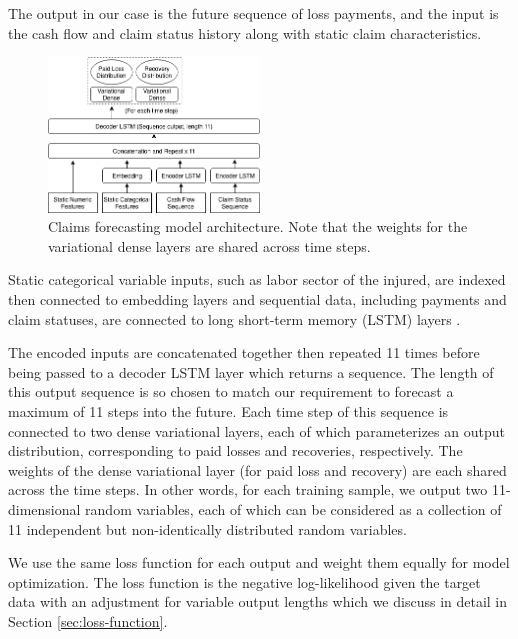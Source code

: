 \documentclass{article}
\begin{document}
The output in our case is the future sequence of loss payments, and the input is the cash flow and claim status history along with static claim characteristics.

\begin{figure}
  \begin{center}
    \includegraphics[width=0.5\textwidth]{images/architecture.png}
  \end{center}
  \caption{Claims forecasting model architecture. Note that the weights for the variational dense layers are shared across time steps.}
  \label{fig:architecture}
\end{figure}

Static categorical variable inputs, such as labor sector of the injured, are indexed then connected to embedding layers \cite{guo2016entity} and sequential data, including payments and claim statuses, are connected to long short-term memory (LSTM) layers \cite{hochreiter1997long}.

The encoded inputs are concatenated together then repeated 11 times before being passed to a decoder LSTM layer which returns a sequence. The length of this output sequence is so chosen to match our requirement to forecast a maximum of 11 steps into the future. Each time step of this sequence is connected to two dense variational layers, each of which parameterizes an output distribution, corresponding to paid losses and recoveries, respectively. The weights of the dense variational layer (for paid loss and recovery) are each shared across the time steps. In other words, for each training sample, we output two 11-dimensional random variables, each of which can be considered as a collection of 11 independent but non-identically distributed random variables.

We use the same loss function for each output and weight them equally for model optimization. The loss function is the negative log-likelihood given the target data with an adjustment for variable output lengths which we discuss in detail in Section \ref{sec:loss-function}.
\end{document}
